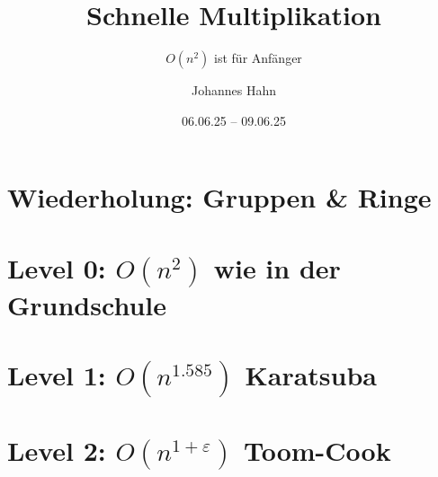 \documentclass[fontsize=11pt,fleqn,a4paper]{scrartcl}
\author{Johannes Hahn}
\title{Schnelle Multiplikation}
\subtitle{$O(n^2)$ ist für Anfänger}
\date{06.06.25 -- 09.06.25}
\begin{document}
\maketitle

\tableofcontents
\pagebreak

\setcounter{section}{-1}
\section{Wiederholung: Gruppen \& Ringe}\label{algebra}



\section{Level 0: $O(n^2)$ wie in der Grundschule}\label{slow_multiplication}



\section{Level 1: $O(n^{1.585})$ Karatsuba}



\section{Level 2: $O(n^{1+\varepsilon})$ Toom-Cook}


\end{document}
